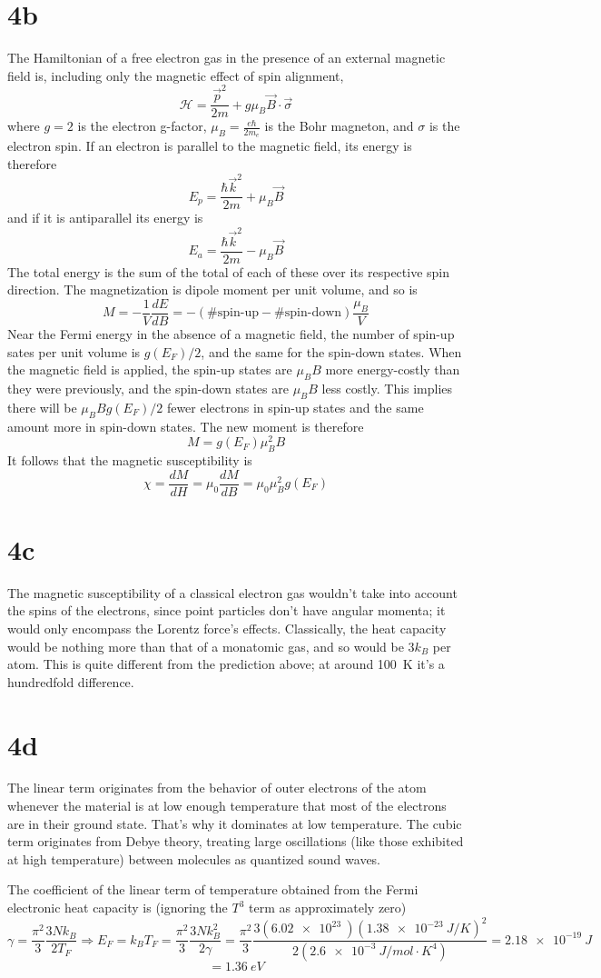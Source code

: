 \documentclass{article}
\begin{document}
\section*{4b}
The Hamiltonian of a free electron gas in the presence of an external magnetic field is, including only the magnetic effect of spin alignment,
\[\mathcal{H}=\frac{\vec{p}^{2}}{2m}+g\mu_{B}\vec{B}\cdot\vec{\sigma}\]
where $g=2$ is the electron g-factor, $\mu_{B}=\frac{e\hbar}{2m_{e}}$ is the Bohr magneton, and $\sigma$ is the electron spin. If an electron is parallel to the magnetic field, its energy is therefore
\[E_{p}=\frac{\hbar\vec{k}^{2}}{2m}+\mu_{B}\vec{B}\]
and if it is antiparallel its energy is
\[E_{a}=\frac{\hbar\vec{k}^{2}}{2m}-\mu_{B}\vec{B}\]
The total energy is the sum of the total of each of these over its respective spin direction.
The magnetization is dipole moment per unit volume, and so is
\[M=-\frac{1}{V}\frac{dE}{dB}=-(\textrm{\# spin-up}-\textrm{\# spin-down})\frac{\mu_{B}}{V}\]
Near the Fermi energy in the absence of a magnetic field, the number of spin-up sates per unit volume is $g(E_{F})/2$, and the same for the spin-down states. When the magnetic field is applied, the spin-up states are $\mu_{B}B$ more energy-costly than they were previously, and the spin-down states are $\mu_{B}B$ less costly. This implies there will be $\mu_{B}Bg(E_{F})/2$ fewer electrons in spin-up states and the same amount more in spin-down states. The new moment is therefore
\[M=g(E_{F})\mu_{B}^{2}B\]
It follows that the magnetic susceptibility is
\[\chi=\frac{dM}{dH}=\mu_{0}\frac{dM}{dB}=\mu_{0}\mu_{B}^{2}g(E_{F})\]

\section*{4c}
The magnetic susceptibility of a classical electron gas wouldn't take into account the spins of the electrons, since point particles don't have angular momenta; it would only encompass the Lorentz force's effects.
Classically, the heat capacity would be nothing more than that of a monatomic gas, and so would be $3k_{B}$ per atom. This is quite different from the prediction above; at around \SI{100}{K} it's a hundredfold difference.

\section*{4d}
The linear term originates from the behavior of outer electrons of the atom whenever the material is at low enough temperature that most of the electrons are in their ground state. That's why it dominates at low temperature.
The cubic term originates from Debye theory, treating large oscillations (like those exhibited at high temperature) between molecules as quantized sound waves.

The coefficient of the linear term of temperature obtained from the Fermi electronic heat capacity is (ignoring the $T^{3}$ term as approximately zero)
\[\gamma=\frac{\pi^{2}}{3}\frac{3Nk_{B}}{2T_{F}}\Rightarrow E_{F}=k_{B}T_{F}=\frac{\pi^{2}}{3}\frac{3Nk_{B}^{2}}{2\gamma}=\frac{\pi^{2}}{3}\frac{3(\SI{6.02e23}{})(\SI{1.38e-23}{J/K})^{2}}{2(\SI{2.6e-3}{J/mol\cdot K^{4}})}=\SI{2.18e-19}{J}\]\[=\SI{1.36}{eV}\]
\end{document}
